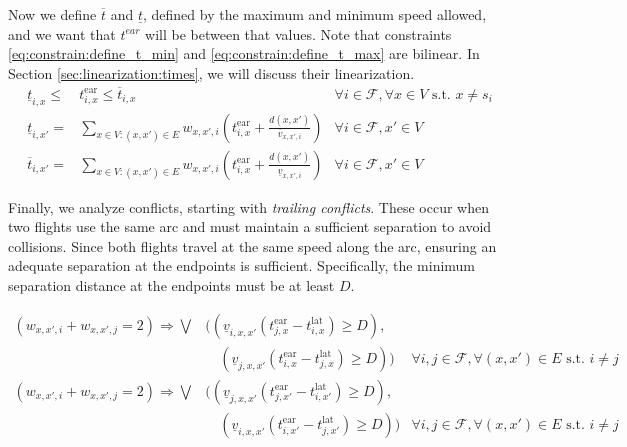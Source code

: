 \documentclass[../../thesis.tex]{subfiles}
\begin{document}
Now we define $\overline t$ and $\underline t$, defined by the maximum and minimum speed allowed, and we want that $t^{ear}$ will be between that values.
Note that constraints \eqref{eq:constrain:define_t_min} and \eqref{eq:constrain:define_t_max} are bilinear. In Section \ref{sec:linearization:times}, we will discuss their linearization.
\begin{align}\label{eq:constrain:defineSpeedBound}
    \underline t_{i,x} \leq& t^\text{ear}_{i,x}\leq \overline t_{i,x}
    &\forall i \in \mathcal F, \forall x\in V\text{ s.t. } x\neq s_i\\
    \underline t_{i,x'}=&\sum_{x\in V: (x,x')\in E} w_{x,x',i}\left(t^\text{ear}_{i,x}+\frac{d(x,x')}{\overline v_{x,x',i}}\right) &\forall i\in \mathcal F, x'\in V
    \label{eq:constrain:define_t_min}\\
    \overline t_{i,x'}=&\sum_{x\in V: (x,x')\in E} w_{x,x',i}\left(t^\text{ear}_{i,x}+\frac{d(x,x')}{\underline v_{x,x',i}}\right) &\forall i \in\mathcal F, x'\in V\label{eq:constrain:define_t_max}
\end{align}

Finally, we analyze conflicts, starting with \textit{trailing conflicts}. These occur when two flights use the same arc and must maintain a sufficient separation to avoid collisions. Since both flights travel at the same speed along the arc, ensuring an adequate separation at the endpoints is sufficient. Specifically, the minimum separation distance at the endpoints must be at least \( D \).

\begin{align}
    (w_{x,x',i} + w_{x,x',j} = 2) \Rightarrow \bigvee&\Bigg(
    (\underline v_{i,x,x'}(t^\text{ear}_{j,x}-t^\text{lat}_{i,x})\geq D), \nonumber \\ 
    &\quad (\underline v_{j,x,x'}(t^\text{ear}_{i,x}-t^\text{lat}_{j,x})\geq D)\Bigg) 
    & \forall i,j \in \mathcal{F}, \forall(x,x') \in E \text{ s.t. } i\neq j\\
    (w_{x,x',i} + w_{x,x',j} = 2) \Rightarrow\bigvee&\Bigg(
    (\underline v_{j,x,x'}(t^\text{ear}_{j,x'}-t^\text{lat}_{i,x'})\geq D), \nonumber\\
    &\quad (\underline v_{i,x,x'}(t^\text{ear}_{i,x'}-t^\text{lat}_{j,x'})\geq D)\Bigg)
    & \forall i,j \in \mathcal{F},\forall(x,x')\in E \text{ s.t. } i\neq j
\end{align}
\end{document}
